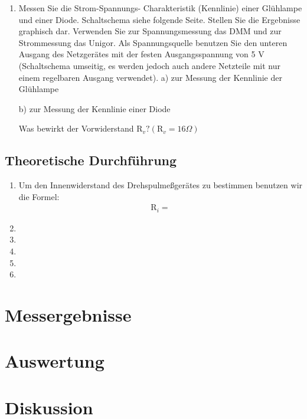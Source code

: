 \documentclass[12pt]{scrartcl}
\begin{document}
\begin{enumerate}
	
	\item
	Messen Sie die Strom-Spannungs-				Charakteristik (Kennlinie) einer 			Glühlampe und einer Diode. Schaltschema 		siehe folgende Seite. Stellen Sie die 		Ergebnisse graphisch dar. Verwenden Sie 		zur Spannungsmessung das DMM und zur 		Strommessung das Unigor. Als 				Spannungsquelle benutzen Sie den unteren 	Ausgang des Netzgerätes mit der festen 		Ausgangsspannung von 5 V (Schaltschema 		umseitig, es werden jedoch auch andere 		Netzteile mit nur einem regelbaren 			Ausgang verwendet).
	a) zur Messung der Kennlinie der 			Glühlampe
	
	
	b) zur Messung der Kennlinie einer Diode
	
	
	Was bewirkt der Vorwiderstand
	$\text{R}_v? (\text{R}_v= 16\Omega)$
\end{enumerate}


\subsection{Theoretische Durchführung}

\begin{enumerate}

	\item
	Um den Innenwiderstand des 					Drehspulmeßgerätes zu bestimmen benutzen 	wir die Formel:
	\begin{align}
	\text{R}_{i}=
	\end{align}
	\item
	\item
	\item
	\item
	\item
	
\end{enumerate}


\section{Messergebnisse}



\section{Auswertung}


\section{Diskussion}


\end{document}
